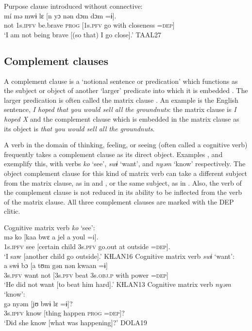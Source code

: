 \documentclass[output=paper]{langscibook}
\begin{document}
\ea Purpose clause introduced without connective:
\label{ex:dettweiler:TAAL27} \\
\gll mí mə mwɨ lɛ [n yɔ nən {dɔm dɔm} =ɨ]. \\
not 1s.\textsc{ipfv} be.brave \textsc{prog} [1s.\textsc{pfv} go with closeness =\textsc{dep}] \\
\glt `I am not being brave [(so that) I go close].' TAAL27
\z

\subsection{Complement clauses}

A complement clause is a `notional sentence or predication' which functions as the subject or object of another `larger' predicate into which it is embedded \citep[52]{Noonan2007}. The larger predication is often called the matrix clause \citep[313]{Payne1997}. An example is the English sentence, \textit{I hoped that you would sell all the groundnuts}: the matrix clause is \textit{I hoped X} and the complement clause which is embedded in the matrix clause as its object is \textit{that you would sell all the groundnuts}.

A verb in the domain of thinking, feeling, or seeing (often called a cognitive verb) frequently takes a complement clause as its direct object. Examples ,  and  exemplify this, with verbs \textit{ko} `see', \textit{swɨ} `want', and \textit{nyəm} `know' respectively. The object complement clause for this kind of matrix verb can take a different subject from the matrix clause, as in  and , or the same subject, as in . Also, the verb of the complement clause is not reduced in its ability to be inflected from the verb of the matrix clause. All three complement clauses are marked with the DEP clitic.

\ea Cognitive matrix verb \textit{ko} `see':
\label{ex:dettweiler:KƗLAN16} \\
\gll mə ko [kaa bwɛ a jel a youl =i]. \\
1s.\textsc{ipfv} see [certain child 3s.\textsc{pfv} go.out at outside =\textsc{dep}]. \\
\glt `I saw [another child go outside].' KƗLAN16
\ex Cognitive matrix verb \textit{swɨ} `want':
\label{ex:dettweiler:KƗLAN13} \\
\gll a swɨ bɔ [a tʊm gən nən kwaan =ɨ] \\
3s.\textsc{pfv} want not [3s.\textsc{pfv} beat 3s.\textsc{obj}.\textsc{p} with power =\textsc{dep}] \\
\glt `He did not want [to beat him hard].' KƗLAN13
\ex Cognitive matrix verb \textit{nyəm} `know':
\label{ex:dettweiler:DOLA19} \\
\gll gə nyəm [jʊ bwɨ lɛ =ɨ]? \\
3s.\textsc{ipfv} know [thing happen \textsc{prog} =\textsc{dep}]? \\
\glt `Did she know [what was happening]?' DOLA19
\z
\end{document}
